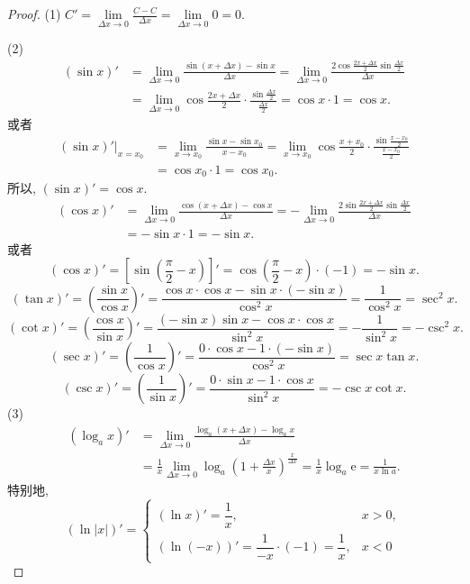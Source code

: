 \begin{proof}
(1) $C' = \lim\limits_{\Delta x\to0}\frac{C - C}{\Delta x} = \lim\limits_{\Delta x\to0}0 = 0$.

(2)
\[
\begin{aligned}
(\sin x)' &= \lim_{\Delta x\to0}\frac{\sin(x+\Delta x) - \sin x}{\Delta x} = \lim_{\Delta x\to0}\frac{2\cos\frac{2x+\Delta x}{2}\sin\frac{\Delta x}{2}}{\Delta x}\\
&= \lim_{\Delta x\to0}\cos\frac{2x+\Delta x}{2}\cdot\frac{\sin\frac{\Delta x}{2}}{\frac{\Delta x}{2}} = \cos x\cdot1 = \cos x.
\end{aligned}
\]
或者
\[
\begin{aligned}
(\sin x)'|_{x=x_0} &= \lim_{x\to x_0}\frac{\sin x - \sin x_0}{x - x_0} = \lim_{x\to x_0}\cos\frac{x+x_0}{2}\cdot\frac{\sin\frac{x-x_0}{2}}{\frac{x-x_0}{2}}\\
&= \cos x_0\cdot1 = \cos x_0.
\end{aligned}
\]
所以, $(\sin x)' = \cos x$.
\[
\begin{aligned}
(\cos x)' &= \lim_{\Delta x\to0}\frac{\cos(x+\Delta x) - \cos x}{\Delta x} = -\lim_{\Delta x\to0}\frac{2\sin\frac{2x+\Delta x}{2}\sin\frac{\Delta x}{2}}{\Delta x}\\
&= -\sin x\cdot1 = -\sin x.
\end{aligned}
\]
或者
\[
(\cos x)' = \left[\sin\left(\frac{\pi}{2} - x\right)\right]' = \cos\left(\frac{\pi}{2} - x\right)\cdot(-1) = -\sin x.
\]
\[
(\tan x)' = \left(\frac{\sin x}{\cos x}\right)' = \frac{\cos x\cdot\cos x - \sin x\cdot(-\sin x)}{\cos^2 x} = \frac{1}{\cos^2 x} = \sec^2 x.
\]
\[
(\cot x)' = \left(\frac{\cos x}{\sin x}\right)' = \frac{(-\sin x)\sin x - \cos x\cdot\cos x}{\sin^2 x} = -\frac{1}{\sin^2 x} = -\csc^2 x.
\]
\[
(\sec x)' = \left(\frac{1}{\cos x}\right)' = \frac{0\cdot\cos x - 1\cdot(-\sin x)}{\cos^2 x} = \sec x\tan x.
\]
\[
(\csc x)' = \left(\frac{1}{\sin x}\right)' = \frac{0\cdot\sin x - 1\cdot\cos x}{\sin^2 x} = -\csc x\cot x.
\]
(3)
\[
\begin{aligned}
(\log_a x)' &= \lim_{\Delta x\to0}\frac{\log_a(x+\Delta x) - \log_a x}{\Delta x}\\
&= \frac{1}{x}\lim_{\Delta x\to0}\log_a\left(1+\frac{\Delta x}{x}\right)^{\frac{x}{\Delta x}} = \frac{1}{x}\log_a\mathrm{e} = \frac{1}{x\ln a}.
\end{aligned}
\]
特别地,
\[
(\ln|x|)' = \begin{cases}
(\ln x)' = \dfrac{1}{x}, & x > 0,\\
(\ln(-x))' = \dfrac{1}{-x}\cdot(-1) = \dfrac{1}{x}, & x < 0

\end{cases}\]
\end{proof}
